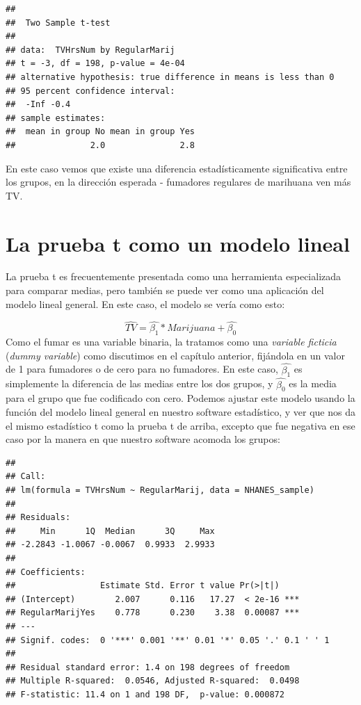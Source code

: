 \documentclass[
  12pt,
]{book}
\begin{document}
\begin{verbatim}
## 
##  Two Sample t-test
## 
## data:  TVHrsNum by RegularMarij
## t = -3, df = 198, p-value = 4e-04
## alternative hypothesis: true difference in means is less than 0
## 95 percent confidence interval:
##  -Inf -0.4
## sample estimates:
##  mean in group No mean in group Yes 
##               2.0               2.8
\end{verbatim}

En este caso vemos que existe una diferencia estadísticamente significativa entre los grupos, en la dirección esperada - fumadores regulares de marihuana ven más TV.

\hypertarget{ttest-linear-model}{%
\section{La prueba t como un modelo lineal}\label{ttest-linear-model}}

La prueba t es frecuentemente presentada como una herramienta especializada para comparar medias, pero también se puede ver como una aplicación del modelo lineal general. En este caso, el modelo se vería como esto:

\[
\hat{TV} = \hat{\beta_1}*Marijuana + \hat{\beta_0}
\]
Como el fumar es una variable binaria, la tratamos como una \emph{variable ficticia} (\emph{dummy variable}) como discutimos en el capítulo anterior, fijándola en un valor de 1 para fumadores o de cero para no fumadores. En este caso, \(\hat{\beta_1}\) es simplemente la diferencia de las medias entre los dos grupos, y \(\hat{\beta_0}\) es la media para el grupo que fue codificado con cero. Podemos ajustar este modelo usando la función del modelo lineal general en nuestro software estadístico, y ver que nos da el mismo estadístico t como la prueba t de arriba, excepto que fue negativa en ese caso por la manera en que nuestro software acomoda los grupos:

\begin{verbatim}
## 
## Call:
## lm(formula = TVHrsNum ~ RegularMarij, data = NHANES_sample)
## 
## Residuals:
##     Min      1Q  Median      3Q     Max 
## -2.2843 -1.0067 -0.0067  0.9933  2.9933 
## 
## Coefficients:
##                 Estimate Std. Error t value Pr(>|t|)    
## (Intercept)        2.007      0.116   17.27  < 2e-16 ***
## RegularMarijYes    0.778      0.230    3.38  0.00087 ***
## ---
## Signif. codes:  0 '***' 0.001 '**' 0.01 '*' 0.05 '.' 0.1 ' ' 1
## 
## Residual standard error: 1.4 on 198 degrees of freedom
## Multiple R-squared:  0.0546, Adjusted R-squared:  0.0498 
## F-statistic: 11.4 on 1 and 198 DF,  p-value: 0.000872
\end{verbatim}
\end{document}

